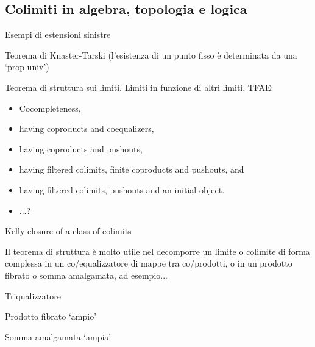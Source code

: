 \subsection{Colimiti in algebra, topologia e logica}
\begin{example}
\end{example}
\begin{example}
	\Todo{}
\end{example}
\begin{example}
\end{example}
\begin{example}
\end{example}
\begin{example}
\end{example}
\begin{example}
\end{example}
\begin{example}
\end{example}
\begin{example}
\end{example}
\begin{example}
\end{example}
\begin{examples}
	Esempi di estensioni sinistre
\end{examples}
\begin{theorem}
	Teorema di Knaster-Tarski (l'esistenza di un punto fisso è determinata da una `prop univ')
\end{theorem}
\begin{theorem}
	Teorema di struttura sui limiti. Limiti in funzione di altri limiti. TFAE:
	\begin{itemize}
		\item 	Cocompleteness,
		\item having coproducts and coequalizers,
		\item having coproducts and pushouts,
		\item having filtered colimits, finite coproducts and pushouts, and
		\item having filtered colimits, pushouts and an initial object.
		\item ...?
	\end{itemize}
	Kelly closure of a class of colimits
\end{theorem}
Il teorema di struttura è molto utile nel decomporre un limite o colimite di forma complessa in un co/equalizzatore di mappe tra co/prodotti, o in un prodotto fibrato o somma amalgamata, ad esempio...
\begin{example}
	Triqualizzatore
\end{example}
\begin{example}
	Prodotto fibrato `ampio'
\end{example}
\begin{example}
	Somma amalgamata `ampia'
\end{example}


